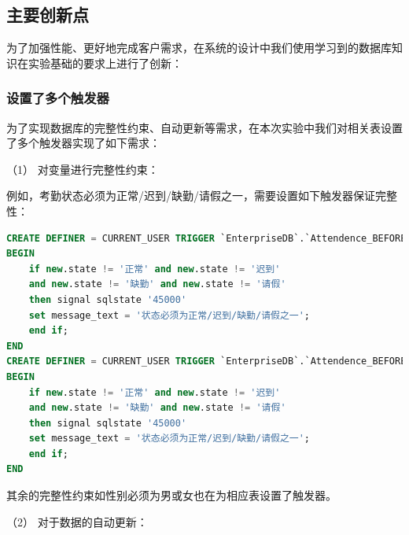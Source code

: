 \documentclass[withoutpreface,bwprint]{cumcmthesis} %
\newcommand{\kuohao}[1]{ \noindent （#1）}
\begin{document}
\subsection{主要创新点}

为了加强性能、更好地完成客户需求，在系统的设计中我们使用学习到的数据库知识在实验基础的要求上进行了创新：


\subsubsection{设置了多个触发器}
为了实现数据库的完整性约束、自动更新等需求，在本次实验中我们对相关表设置了多个触发器实现了如下需求：

\kuohao{1} 对变量进行完整性约束：

例如，考勤状态必须为正常/迟到/缺勤/请假之一，需要设置如下触发器保证完整性：
\begin{lstlisting}[language=SQL]
CREATE DEFINER = CURRENT_USER TRIGGER `EnterpriseDB`.`Attendence_BEFORE_INSERT` BEFORE INSERT ON `Attendence` FOR EACH ROW
BEGIN
	if new.state != '正常' and new.state != '迟到' 
    and new.state != '缺勤' and new.state != '请假'
	then signal sqlstate '45000'
    set message_text = '状态必须为正常/迟到/缺勤/请假之一';
	end if;
END
CREATE DEFINER = CURRENT_USER TRIGGER `EnterpriseDB`.`Attendence_BEFORE_UPDATE` BEFORE UPDATE ON `Attendence` FOR EACH ROW
BEGIN
	if new.state != '正常' and new.state != '迟到' 
    and new.state != '缺勤' and new.state != '请假'
	then signal sqlstate '45000'
    set message_text = '状态必须为正常/迟到/缺勤/请假之一';
	end if;
END
\end{lstlisting}
其余的完整性约束如性别必须为男或女也在为相应表设置了触发器。

\vspace{1em}
\kuohao{2} 对于数据的自动更新：
\end{document}
